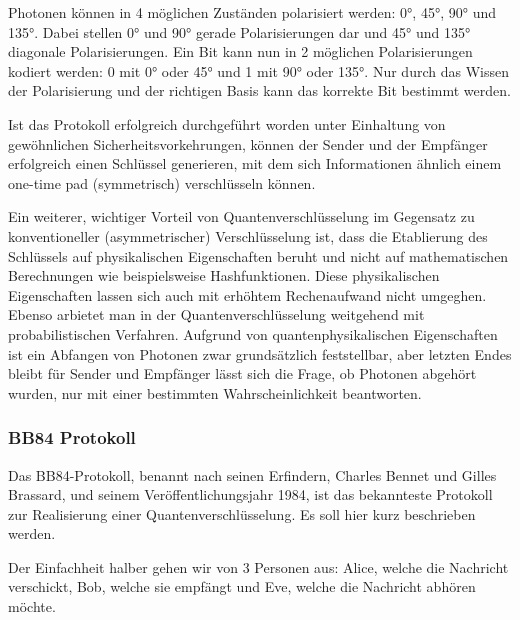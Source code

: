 \documentclass[a4paper,10.2pt,pdftex]{scrartcl}%
\begin{document}
Photonen können in 4 möglichen Zuständen polarisiert werden: 0°, 45°, 90° und 135°. Dabei stellen 0° und 90° gerade Polarisierungen dar und 45° und 135° diagonale Polarisierungen. Ein Bit kann nun in 2 möglichen Polarisierungen kodiert werden: 0 mit 0° oder 45° und 1 mit 90° oder 135°. Nur durch das Wissen der Polarisierung und der richtigen Basis kann das korrekte Bit bestimmt werden.

Ist das Protokoll erfolgreich durchgeführt worden unter Einhaltung von gewöhnlichen Sicherheitsvorkehrungen, können der Sender und der Empfänger erfolgreich einen Schlüssel generieren, mit dem sich Informationen ähnlich einem one-time pad (symmetrisch) verschlüsseln können. 

Ein weiterer, wichtiger Vorteil von Quantenverschlüsselung im Gegensatz zu konventioneller (asymmetrischer) Verschlüsselung ist, dass die Etablierung des Schlüssels auf physikalischen Eigenschaften beruht und nicht auf mathematischen Berechnungen wie beispielsweise Hashfunktionen. Diese physikalischen Eigenschaften lassen sich auch mit erhöhtem Rechenaufwand nicht umgeghen. Ebenso arbietet man in der Quantenverschlüsselung weitgehend mit probabilistischen Verfahren. Aufgrund von quantenphysikalischen Eigenschaften ist ein Abfangen von Photonen zwar grundsätzlich feststellbar, aber letzten Endes bleibt für Sender und Empfänger lässt sich die Frage, ob Photonen abgehört wurden, nur mit einer bestimmten Wahrscheinlichkeit beantworten. 


\subsubsection{BB84 Protokoll}
Das BB84-Protokoll, benannt nach seinen Erfindern, Charles Bennet und Gilles Brassard, und seinem Veröffentlichungsjahr 1984, ist das bekannteste Protokoll zur Realisierung einer Quantenverschlüsselung. Es soll hier kurz beschrieben werden.

Der Einfachheit halber gehen wir von 3 Personen aus: Alice, welche die Nachricht verschickt, Bob, welche sie empfängt und Eve, welche die Nachricht abhören möchte.
\end{document}
